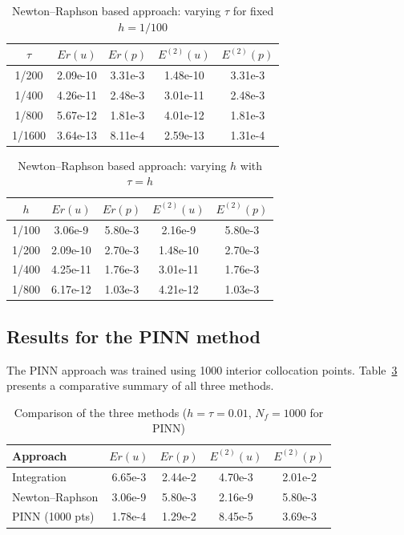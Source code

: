 \documentclass[reqno]{amsart}
\begin{document}
\begin{table}[H]
\centering
\caption{Newton--Raphson based approach: varying $\tau$ for fixed $h = 1/100$}
\label{tab:newton-tau}
\begin{tabular}{c|c|c|c|c}
\hline
$\tau$ & $Er(u)$ & $Er(p)$ & $E^{(2)}(u)$ & $E^{(2)}(p)$ \\
\hline
1/200  & 2.09e-10 & 3.31e-3 & 1.48e-10 & 3.31e-3 \\
1/400  & 4.26e-11 & 2.48e-3 & 3.01e-11 & 2.48e-3 \\
1/800  & 5.67e-12 & 1.81e-3 & 4.01e-12 & 1.81e-3 \\
1/1600 & 3.64e-13 & 8.11e-4 & 2.59e-13 & 1.31e-4 \\
\hline
\end{tabular}
\end{table}

\begin{table}[H]
\centering
\caption{Newton--Raphson based approach: varying $h$ with $\tau = h$}
\label{tab:newton-h}
\begin{tabular}{c|c|c|c|c}
\hline
$h$ & $Er(u)$ & $Er(p)$ & $E^{(2)}(u)$ & $E^{(2)}(p)$ \\
\hline
1/100 & 3.06e-9 & 5.80e-3 & 2.16e-9 & 5.80e-3 \\
1/200 & 2.09e-10 & 2.70e-3 & 1.48e-10 & 2.70e-3 \\
1/400 & 4.25e-11 & 1.76e-3 & 3.01e-11 & 1.76e-3 \\
1/800 & 6.17e-12 & 1.03e-3 & 4.21e-12 & 1.03e-3 \\
\hline
\end{tabular}
\end{table}

\subsection{Results for the PINN method}
The PINN approach was trained using 1000 interior collocation points. Table~\ref{tab:comparison} presents a comparative summary of all three methods.

\begin{table}[H]
\centering
\caption{Comparison of the three methods ($h = \tau = 0.01$, $N_f = 1000$ for PINN)}
\label{tab:comparison}
\begin{tabular}{l|c|c|c|c}
\hline
Approach & $Er(u)$ & $Er(p)$ & $E^{(2)}(u)$ & $E^{(2)}(p)$ \\
\hline
Integration     & 6.65e-3 & 2.44e-2 & 4.70e-3 & 2.01e-2 \\
Newton--Raphson & 3.06e-9 & 5.80e-3 & 2.16e-9 & 5.80e-3 \\
PINN (1000 pts) & 1.78e-4 & 1.29e-2 & 8.45e-5 & 3.69e-3 \\
\hline
\end{tabular}
\end{table}
\end{document}
